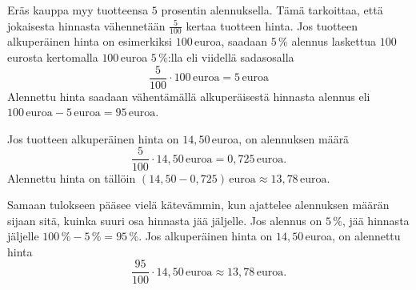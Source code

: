 \begin{esimerkki}
Eräs kauppa myy tuotteensa $5$ prosentin alennuksella. Tämä tarkoittaa, että jokaisesta hinnasta vähennetään $\frac{5}{100}$ kertaa tuotteen hinta. Jos tuotteen alkuperäinen hinta on esimerkiksi $100$\,euroa, saadaan $5\,\%$ alennus laskettua $100$\,eurosta kertomalla $100$\,euroa $5\,\%$:lla eli viidellä sadasosalla 
\[
\frac{5}{100} \cdot 100\,\text{euroa} = 5\,\text{euroa}
\]
Alennettu hinta saadaan vähentämällä alkuperäisestä hinnasta alennus eli $100\,\text{euroa} - 5\,\text{euroa} = 95\,\text{euroa}$.

Jos tuotteen alkuperäinen hinta on $14,50$\,euroa, on alennuksen määrä
\[
	\frac{5}{100} \cdot 14,50\,\text{euroa} = 0,725\,\text{euroa}.
\]
Alennettu hinta on tällöin $(14,50 - 0,725)\,\text{euroa} \approx 13,78\,\text{euroa}$.

Samaan tulokseen pääsee vielä kätevämmin, kun ajattelee alennuksen määrän sijaan sitä, kuinka suuri osa hinnasta jää jäljelle. Jos alennus on $5\,\%$, jää hinnasta jäljelle $100\,\% - 5\,\% = 95\,\%$. Jos alkuperäinen hinta on $14,50$\,euroa, on alennettu hinta 
\[
	\frac{95}{100} \cdot 14,50\,\text{euroa} \approx 13,78\,\text{euroa}.
\]
\end{esimerkki}

